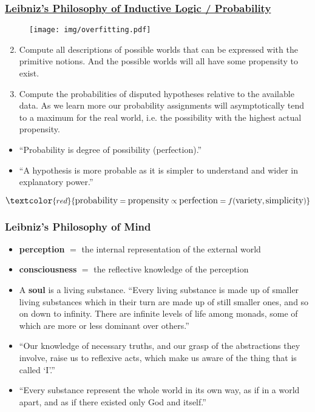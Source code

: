 \documentclass[UTF8,11pt,colorlinks,compress,openany]{beamer}%
\begin{document}
\begin{frame}\frametitle{\href{https://philpapers.org/rec/HACTLP}{Leibniz's Philosophy of Inductive Logic / Probability}}
		\begin{figure}
			\texttt{[image: img/overfitting.pdf]}
		\end{figure}
		\vspace{-7pt}
	\begin{enumerate}\setcounter{enumi}{1}
			\item Compute all descriptions of possible worlds that can be expressed with the primitive notions. And the possible worlds will all have some propensity to exist.
			\item Compute the probabilities of disputed hypotheses relative to the available data. As we learn more our probability assignments will asymptotically tend to a maximum for the real world, i.e. the possibility with the highest actual propensity.
		\end{enumerate}
\begin{itemize}
		\item ``Probability is degree of possibility (perfection).''
		\item ``A hypothesis is more probable as it is simpler to understand and wider in explanatory power.''
	\end{itemize}
	\[\large\textcolor{red}{\mbox{probability} = \mbox{propensity} \propto \mbox{perfection} = f(\mbox{variety},\mbox{simplicity})}\]
\end{frame}

\begin{frame}\frametitle{Leibniz's Philosophy of Mind}
\centerline{\hspace*{-1ex}}
	\begin{itemize}
		\item \textbf{perception} $=$ the internal representation of the external world
		\item \textbf{consciousness} $=$ the reflective knowledge of the perception
	\end{itemize}
	\begin{itemize}
		\item A \textbf{soul} is a living substance. ``Every living substance is made up of smaller living substances which in their turn are made up of still smaller ones, and so on down to infinity. There are infinite levels of life among monads, some of which are more or less dominant over others.''
		\item ``Our knowledge of necessary truths, and our grasp of the abstractions they involve, raise us to reflexive acts, which make us aware of the thing that is called `I'.''
		\item ``Every substance represent the whole world in its own way, as if in a world apart, and as if there existed only God and itself.''
	\end{itemize}
\end{frame}
\end{document}
